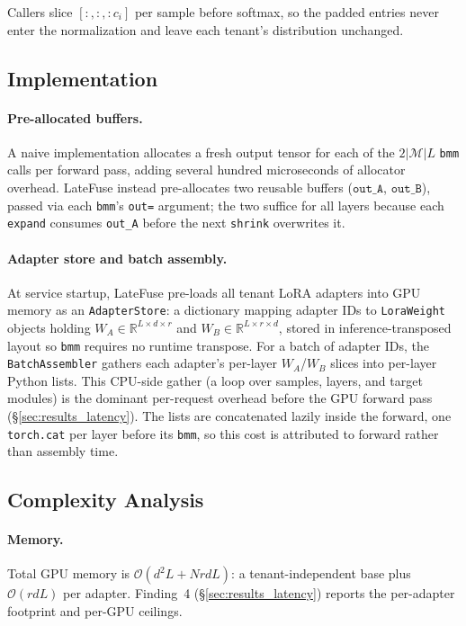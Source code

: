 \documentclass[11pt]{article}
\newcommand{\sysname}{LateFuse}
\begin{document}
Callers slice $[:, :, :c_i]$ per sample before softmax, so the padded
entries never enter the normalization and leave each tenant's
distribution unchanged.

\subsection{Implementation}
\label{sec:impl}

\paragraph{Pre-allocated buffers.}
A naive implementation allocates a fresh output tensor for each of the
$2 |\mathcal{M}| L$ \texttt{bmm} calls per forward pass, adding several hundred
microseconds of allocator overhead. \sysname{} instead pre-allocates two
reusable buffers ($\mathtt{out\_A}$, $\mathtt{out\_B}$), passed via each
\texttt{bmm}'s \texttt{out=} argument; the two suffice for all layers because
each \texttt{expand} consumes \texttt{out\_A} before the next \texttt{shrink}
overwrites it.

\paragraph{Adapter store and batch assembly.}
At service startup, \sysname{} pre-loads all tenant LoRA adapters into GPU
memory as an \texttt{AdapterStore}: a dictionary mapping adapter IDs to
\texttt{LoraWeight} objects holding
$W_A \in \mathbb{R}^{L \times d \times r}$ and
$W_B \in \mathbb{R}^{L \times r \times d}$, stored in inference-transposed
layout so \texttt{bmm} requires no runtime transpose.
For a batch of adapter IDs, the \texttt{BatchAssembler} gathers each adapter's
per-layer $W_A$/$W_B$ slices into per-layer Python lists. This CPU-side gather
(a loop over samples, layers, and target modules) is the dominant per-request
overhead before the GPU forward pass (\S\ref{sec:results_latency}). The lists
are concatenated lazily inside the forward, one \texttt{torch.cat} per layer
before its \texttt{bmm}, so this cost is attributed to forward rather than
assembly time.

\subsection{Complexity Analysis}
\label{sec:complexity}

\paragraph{Memory.}
Total GPU memory is $\mathcal{O}(d^2 L + N r d L)$: a tenant-independent base
plus $\mathcal{O}(r d L)$ per adapter. Finding~4 (\S\ref{sec:results_latency})
reports the per-adapter footprint and per-GPU ceilings.
\end{document}
